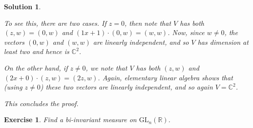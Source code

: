 \documentclass{article}
\newtheorem{ex}{Exercise}
\theoremstyle{nonumberplain}
\newtheorem{sol}{Solution}
\newcommand{\R}{\mathbb{R}}
\newcommand{\C}{\mathbb{C}}
\newcommand{\GL}{\mathrm{GL}}
\begin{document}
\begin{sol}
\begin{enumerate}
To see this, there are two cases. If $z = 0$, then note that $V$ has both $(z,w) = (0,w)$ and $(1x+1) \cdot (0,w) = (w,w)$. Now, since $w \neq 0$, the vectors $(0,w)$ and $(w,w)$ are linearly independent, and so $V$ has dimension at least two and hence is $\C^2$.

On the other hand, if $z \neq 0$, we note that $V$ has both $(z,w)$ and $(2x+0) \cdot (z,w) = (2z,w)$. Again, elementary linear algebra shows that (using $z \neq 0$) these two vectors are linearly independent, and so again $V = \C^2$.

This concludes the proof.
\end{enumerate}
\end{sol}

\begin{ex}
Find a bi-invariant measure on $\GL_n(\R)$.
\end{ex}
\end{document}
